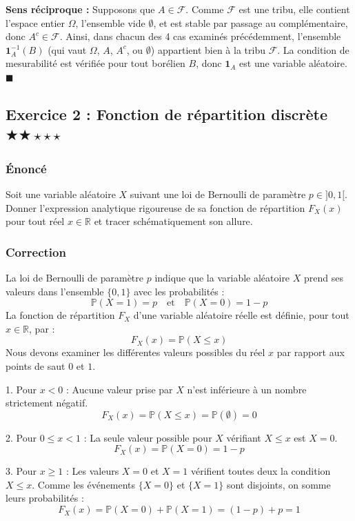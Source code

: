 \documentclass[11pt,a4paper]{article}
\begin{document}
\textbf{Sens réciproque :} Supposons que $A \in \mathcal{F}$. Comme $\mathcal{F}$ est une tribu, elle contient l'espace entier $\Omega$, l'ensemble vide $\emptyset$, et est stable par passage au complémentaire, donc $A^c \in \mathcal{F}$. Ainsi, dans chacun des 4 cas examinés précédemment, l'ensemble $\mathbf{1}_A^{-1}(B)$ (qui vaut $\Omega$, $A$, $A^c$, ou $\emptyset$) appartient bien à la tribu $\mathcal{F}$. La condition de mesurabilité est vérifiée pour tout borélien $B$, donc $\mathbf{1}_A$ est une variable aléatoire. $\blacksquare$


\subsection*{Exercice 2 : Fonction de répartition discrète \quad $\bigstar\bigstar\star\star\star$}

\subsubsection*{Énoncé}

Soit une variable aléatoire $X$ suivant une loi de Bernoulli de paramètre $p \in ]0, 1[$.
Donner l'expression analytique rigoureuse de sa fonction de répartition $F_X(x)$ pour tout réel $x \in \mathbb{R}$ et tracer schématiquement son allure.

\subsubsection*{Correction}

La loi de Bernoulli de paramètre $p$ indique que la variable aléatoire $X$ prend ses valeurs dans l'ensemble $\{0, 1\}$ avec les probabilités :
$$ \mathbb{P}(X = 1) = p \quad \text{et} \quad \mathbb{P}(X = 0) = 1 - p $$
La fonction de répartition $F_X$ d'une variable aléatoire réelle est définie, pour tout $x \in \mathbb{R}$, par :
$$ F_X(x) = \mathbb{P}(X \leq x) $$
Nous devons examiner les différentes valeurs possibles du réel $x$ par rapport aux points de saut $0$ et $1$.

1. Pour $x < 0$ :
   Aucune valeur prise par $X$ n'est inférieure à un nombre strictement négatif.
   $$ F_X(x) = \mathbb{P}(X \leq x) = \mathbb{P}(\emptyset) = 0 $$

2. Pour $0 \leq x < 1$ :
   La seule valeur possible pour $X$ vérifiant $X \leq x$ est $X = 0$.
   $$ F_X(x) = \mathbb{P}(X = 0) = 1 - p $$

3. Pour $x \geq 1$ :
   Les valeurs $X=0$ et $X=1$ vérifient toutes deux la condition $X \leq x$. Comme les événements $\{X=0\}$ et $\{X=1\}$ sont disjoints, on somme leurs probabilités :
   $$ F_X(x) = \mathbb{P}(X = 0) + \mathbb{P}(X = 1) = (1 - p) + p = 1 $$
\end{document}
